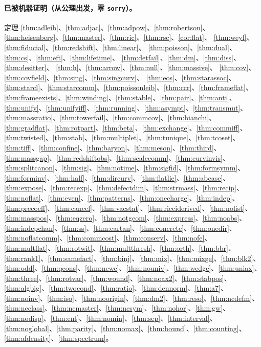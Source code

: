 \documentclass[11pt,a4paper]{article}
\theoremstyle{sudef}
\begin{document}
\paragraph{已被机器证明（从公理出发，零 \texttt{sorry}）。}
定理 \ref{thm:adleib}、\ref{thm:adjac}、\ref{thm:adpow}、\ref{thm:robertson}、
\ref{thm:heisenberg}、\ref{thm:master}、\ref{thm:ric}、\ref{thm:rsc}、\ref{cor:flat}、
\ref{thm:weyl}、\ref{thm:fiducial}、\ref{thm:redshift}、\ref{thm:linear}、
\ref{thm:poisson}、\ref{thm:dual}、\ref{thm:cs}、\ref{thm:eft}、\ref{thm:lifetime}、
\ref{thm:detfail}、\ref{thm:dm}、\ref{thm:diss}、\ref{thm:desitter}、
\ref{thm:h}、\ref{thm:arrow}、\ref{thm:null}、\ref{thm:massive}、
\ref{thm:cov}、\ref{thm:covfield}、\ref{thm:sing}、\ref{thm:singcurv}、
\ref{thm:eos}、\ref{thm:starassoc}、\ref{thm:starcl}、\ref{thm:starcomm}、\ref{thm:poissonleib}、\ref{thm:ccr}、\ref{thm:frameflat}、\ref{thm:frameexists}、\ref{thm:winding}、\ref{thm:stable}、\ref{thm:pair}、\ref{thm:anti}、\ref{thm:unify}、\ref{thm:unifyiff}、\ref{thm:running}、\ref{thm:asympt}、\ref{thm:transmut}、\ref{thm:massratio}、\ref{thm:towerfail}、\ref{thm:commcov}、\ref{thm:bianchi}、\ref{thm:gradflat}、\ref{thm:rotpart}、\ref{thm:beta}、\ref{thm:exchange}、\ref{thm:commiff}、\ref{thm:twisted}、\ref{thm:stab}、\ref{thm:multiplet}、\ref{thm:tunique}、\ref{thm:tcoset}、\ref{thm:tiff}、\ref{thm:confine}、\ref{thm:baryon}、\ref{thm:meson}、\ref{thm:third}、\ref{thm:massgap}、\ref{thm:redshiftobs}、\ref{thm:scalecomm}、\ref{thm:curvinvis}、\ref{thm:splitcanon}、\ref{thm:sig}、\ref{thm:notime}、\ref{thm:sigfid}、\ref{thm:formsymm}、\ref{thm:forminv}、\ref{thm:half}、\ref{thm:dircurv}、\ref{thm:flatlie}、\ref{thm:abcase}、\ref{thm:expose}、\ref{thm:recexp}、\ref{thm:defectdim}、\ref{thm:strmass}、\ref{thm:recip}、\ref{thm:noflat}、\ref{thm:even}、\ref{thm:patterns}、\ref{thm:onecharge}、\ref{thm:indep}、\ref{thm:precoeff}、\ref{thm:cancel}、\ref{thm:vacstat}、\ref{thm:ricciderived}、\ref{thm:nolist}、\ref{thm:masspos}、\ref{thm:eqzero}、\ref{thm:notgeom}、\ref{thm:express}、\ref{thm:noabs}、\ref{thm:indepchan}、\ref{thm:ss}、\ref{thm:cartan}、\ref{thm:concrete}、\ref{thm:onedir}、\ref{thm:noflatcomm}、\ref{thm:commcost}、\ref{thm:conserv}、\ref{thm:nofe}、\ref{thm:multflat}、\ref{thm:rotwit}、\ref{thm:multthresh}、\ref{thm:orth}、\ref{thm:bbr}、\ref{thm:rank1}、\ref{thm:samefact}、\ref{thm:binj}、\ref{thm:mix}、\ref{thm:mixge}、\ref{thm:blk2}、\ref{thm:odd}、\ref{thm:qcons}、\ref{thm:newc}、\ref{thm:nouniv}、\ref{thm:wedge}、\ref{thm:uniax}、\ref{thm:three}、\ref{thm:rotvar}、\ref{thm:wound}、\ref{thm:noax2}、\ref{thm:stabpos}、\ref{thm:algbig}、\ref{thm:twocond}、\ref{thm:ratio}、\ref{thm:dennorm}、\ref{thm:a7}、\ref{thm:noinv}、\ref{thm:iso}、\ref{thm:noorigin}、\ref{thm:dm2}、\ref{thm:reso}、\ref{thm:ncdefm}、\ref{thm:ncclass}、\ref{thm:ncmaster}、\ref{thm:ncsym}、\ref{thm:nohor}、\ref{thm:gw}、\ref{thm:nodisp}、\ref{thm:ent}、\ref{thm:nomin}、\ref{thm:sep}、\ref{thm:interval}、\ref{thm:noglobal}、\ref{thm:parity}、\ref{thm:nomax}、\ref{thm:bound}、\ref{thm:counting}、\ref{thm:afdensity}、\ref{thm:spectrum}。
\end{document}
